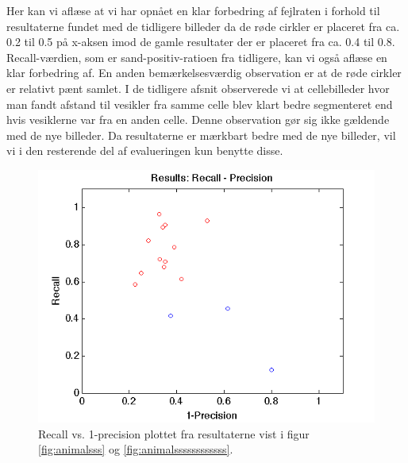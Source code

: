 Her kan vi aflæse at vi har opnået en klar forbedring af fejlraten i forhold til resultaterne fundet med de tidligere billeder da de røde cirkler er placeret fra ca. 0.2 til 0.5 på x-aksen imod de gamle resultater der er placeret fra ca. 0.4 til 0.8. Recall-værdien, som er sand-positiv-ratioen fra tidligere, kan vi også aflæse en klar forbedring af. En anden bemærkelsesværdig observation er at de røde cirkler er relativt pænt samlet. I de tidligere afsnit observerede vi at cellebilleder hvor man fandt afstand til vesikler fra samme celle blev klart bedre segmenteret end hvis vesiklerne var fra en anden celle. Denne observation gør sig ikke gældende med de nye billeder. Da resultaterne er mærkbart bedre med de nye billeder, vil vi i den resterende del af evalueringen kun benytte disse.

\begin{figure}[H]
	\centering
	\includegraphics[scale=0.9]{files/postmethod/img/recallvsprecision.png}
	\caption{Recall vs. 1-precision plottet fra resultaterne vist i figur \ref{fig:animalsss} og \ref{fig:animalssssssssssss}.\label{fig:postmethod_recallprec}}
\end{figure}

